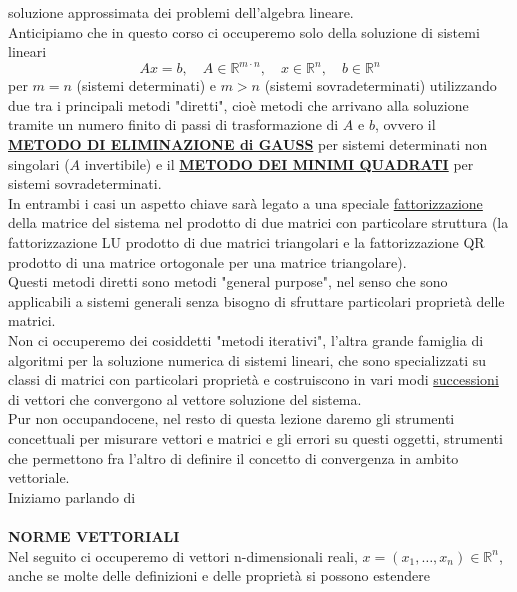 \documentclass[12pt,a4paper]{article}
\begin{document}
soluzione approssimata dei problemi dell'algebra lineare.\\
Anticipiamo che in questo corso ci occuperemo solo della soluzione di sistemi lineari
\begin{equation*}
    Ax=b,\quad A\in\mathbb{R}^{m\cdot n}, \quad x\in\mathbb{R}^n,\quad b\in\mathbb{R}^n
\end{equation*}
per $m=n$ (sistemi determinati) e $m>n$ (sistemi sovradeterminati) utilizzando due tra i principali metodi "diretti", cioè metodi che arrivano alla soluzione tramite un numero finito di passi di trasformazione di $A$ e $b$, ovvero il \underline{\textbf{METODO DI ELIMINAZIONE di GAUSS}} per sistemi determinati
non singolari ($A$ invertibile) e il \underline{\textbf{METODO DEI MINIMI QUADRATI}} per sistemi sovradeterminati.\\In entrambi i casi un aspetto chiave sarà legato a una speciale \underline{fattorizzazione} della matrice del sistema nel prodotto di due matrici con particolare struttura (la fattorizzazione LU prodotto di due matrici triangolari e la fattorizzazione QR prodotto di una matrice ortogonale per una matrice triangolare).\\Questi metodi diretti sono metodi
"general purpose", nel senso che sono applicabili a sistemi generali senza bisogno di sfruttare particolari proprietà delle matrici.\\Non ci occuperemo dei cosiddetti "metodi iterativi", l'altra grande famiglia di algoritmi per la soluzione numerica di sistemi lineari, che sono specializzati su classi di matrici con particolari proprietà e costruiscono in vari modi \underline{successioni} di vettori che convergono al vettore soluzione del sistema.\\Pur non occupandocene, nel
resto di questa lezione daremo gli strumenti concettuali per misurare vettori e matrici e gli errori su questi oggetti, strumenti che permettono fra l'altro di definire il concetto di convergenza in ambito vettoriale.\\
Iniziamo parlando di\\\\
\textbf{NORME VETTORIALI}\\
Nel seguito ci occuperemo di vettori n-dimensionali reali, $x = (x_1, \dotso, x_n) \in \mathbb{R}^n$, anche se molte delle definizioni e delle proprietà si possono estendere
\end{document}
